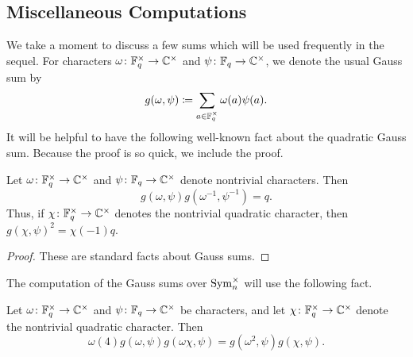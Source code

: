 \subsection{Miscellaneous Computations}
We take a moment to discuss a few sums which will be used frequently in the sequel. For characters $\omega\colon\mathbb F_q^\times\to\mathbb C^\times$ and $\psi\colon\mathbb F_q\to\mathbb C^\times$, we denote the usual Gauss sum by
\[g(\omega,\psi)\coloneqq\sum_{a\in\mathbb F_q^\times}\omega(a)\psi(a).\]
It will be helpful to have the following well-known fact about the quadratic Gauss sum. Because the proof is so quick, we include the proof.
\begin{prop} \label{prop:mag-gauss-sum}
    Let $\omega\colon\mathbb F_q^\times\to\mathbb C^\times$ and $\psi\colon\mathbb F_q\to\mathbb C^\times$ denote nontrivial characters. Then
    \[g(\omega,\psi)g\left(\omega^{-1},\psi^{-1}\right)=q.\]
    Thus, if $\chi\colon\mathbb F_q^\times\to\mathbb C^\times$ denotes the nontrivial quadratic character, then $g(\chi,\psi)^2=\chi(-1)q$.
\end{prop}
\begin{proof}
    These are standard facts about Gauss sums.
\end{proof}
The computation of the Gauss sums over $\operatorname{Sym}_n^\times$ will use the following fact.
\begin{prop} \label{prop:quad-twist-gauss-sum}
    Let $\omega\colon\mathbb F_q^\times\to\mathbb C^\times$ and $\psi\colon\mathbb F_q\to\mathbb C^\times$ be characters, and let $\chi\colon\mathbb F_q^\times\to\mathbb C^\times$ denote the nontrivial quadratic character. Then
    \[\omega(4)g(\omega,\psi)g(\omega\chi,\psi)=g\left(\omega^2,\psi\right)g(\chi,\psi).\]
\end{prop}
